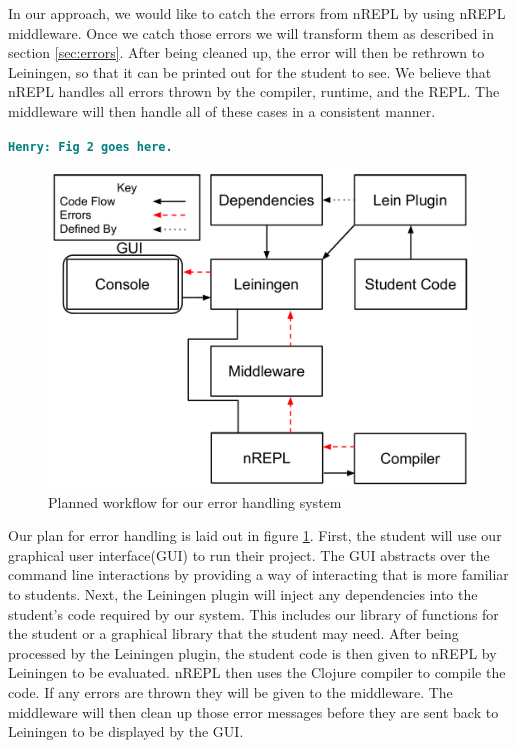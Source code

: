 \documentclass[12pt]{article}
\newcommand{\comment}[1]{{\bf \tt  {#1}}}
\newcommand{\emcomment}[1]{\textcolor{ForestGreen}{\comment{Elena: {#1}}}}
\newcommand{\hfcomment}[1]{\textcolor{Teal}{\comment{Henry: {#1}}}}
\begin{document}
In our approach, we would like to catch the errors from nREPL by using nREPL middleware. Once we catch those errors we will 
transform them as described in section \ref{sec:errors}. After being cleaned up, the error will then be rethrown to Leiningen, so 
that it can be printed out for the student to see. We believe that nREPL handles all errors thrown by the compiler, runtime, and 
the REPL. The middleware will then handle all of these cases in a consistent manner.

\hfcomment{Fig 2 goes here.}
\begin{figure}[h]
 \includegraphics[width=12cm]{OurErrorHandlingSystem.pdf}
 \centering
  \caption{Planned workflow for our error handling system}
 \label{fig:OurSystem}
\end{figure}

Our plan for error handling is laid out in figure \ref{fig:OurSystem}. First, the student will use our graphical user 
interface(GUI) to run their project. The GUI abstracts over the command line interactions by providing a way of interacting that 
is more familiar to students. Next, the Leiningen plugin will inject any dependencies into the student's code required by our 
system. This includes our library of functions for the student or a graphical library that the student may need. After being 
processed by the Leiningen plugin, the student code is then given to nREPL by Leiningen to be evaluated. nREPL then uses the 
Clojure compiler to compile the code. If any errors are thrown they will be given to the middleware. The middleware will then 
clean up those error messages before they are sent back to Leiningen to be displayed by the GUI.
\end{document}
